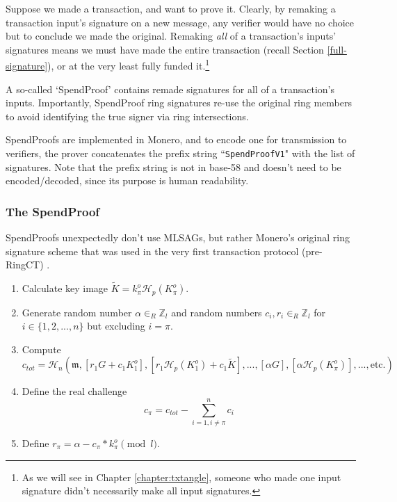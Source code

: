 Suppose we made a transaction, and want to prove it. Clearly, by remaking a transaction input's signature on a new message, any verifier would have no choice but to conclude we made the original. Remaking {\em all} of a transaction's inputs' signatures means we must have made the entire transaction (recall Section \ref{full-signature}), or at the very least fully funded it.\footnote{As we will see in Chapter \ref{chapter:txtangle}, someone who made one input signature didn't necessarily make all input signatures.}

A so-called `SpendProof' contains remade signatures for all of a transaction's inputs. Importantly, SpendProof ring signatures re-use the original ring members to avoid identifying the true signer via ring intersections.

SpendProofs are implemented in Monero, and to encode one for transmission to verifiers, the prover concatenates the prefix string ``{\tt SpendProofV1}" with the list of signatures. Note that the prefix string is not in base-58 and doesn't need to be encoded/decoded, since its purpose is human readability.%

\subsubsection*{The SpendProof}

SpendProofs unexpectedly don't use MLSAGs, but rather Monero's original ring signature scheme  that was used in the very first transaction protocol (pre-RingCT) \cite{cryptoNoteWhitePaper}.

\begin{enumerate}
	\item Calculate key image \(\tilde{K} = k^o_\pi \mathcal{H}_p(K^o_\pi)\).

	\item Generate random number \(\alpha \in_R \mathbb{Z}_l\) and random numbers  \(c_i, r_i \in_R \mathbb{Z}_l\) for \(i \in \{1, 2, ..., n\}\) but excluding \(i = \pi\).

	\item Compute
	\[c_{tot} = \mathcal{H}_n(\mathfrak{m},[r_1 G + c_1 K^o_1],[r_1 \mathcal{H}_p(K^o_1) + c_1 \tilde{K}],...,[\alpha G],[\alpha \mathcal{H}_p(K^o_{\pi})],...,\textrm{etc.})\]

	\item Define the real challenge
	\[c_{\pi} = c_{tot} - \sum^{n}_{i=1,i\neq \pi} c_i\]

	\item Define \(r_{\pi} = \alpha - c_{\pi}*k^o_{\pi} \pmod l\).
\end{enumerate}

